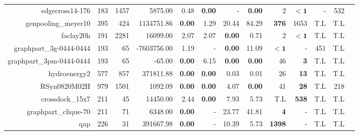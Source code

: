 \begin{landscape}
\begin{table*}[t]
\begin{tabular}{|r|r|r||r||r|r|r|r||r|r|r|r|r|}
                     edgecross14-176 &           183 &          1457 &                           5875.00 &           0.48 &  \textbf{0.00} &              - &  \textbf{0.00} &                  2 &         $\bm{< 1}$ &                  - &                532 \\ 
                 genpooling\_meyer10 &           395 &           424 &                        1134751.86 &  \textbf{0.00} &           1.29 &          20.44 &          84.29 &       \textbf{376} &               1653 &                T.L &                T.L \\ 
                           faclay20h &           191 &          2281 &                          16099.00 &           2.07 &           2.07 &  \textbf{0.00} &           0.71 &                  2 &         $\bm{< 1}$ &                T.L &                T.L \\ 
             graphpart\_3g-0444-0444 &           193 &            65 &                       -7603756.00 &           1.19 &              - &  \textbf{0.00} &          11.09 &         $\bm{< 1}$ &                  - &                451 &                T.L \\ 
            graphpart\_3pm-0444-0444 &           193 &            65 &                            -65.00 &  \textbf{0.00} &           6.15 &  \textbf{0.00} &  \textbf{0.00} &                 46 &         \textbf{3} &                T.L &                T.L \\ 
                        hydroenergy2 &           577 &           857 &                         371811.88 &  \textbf{0.00} &  \textbf{0.00} &           0.03 &           0.01 &                 26 &        \textbf{13} &                T.L &                T.L \\ 
                        RSyn0820M02H &           979 &          1501 &                           1092.09 &  \textbf{0.00} &  \textbf{0.00} &           4.07 &  \textbf{0.00} &                 41 &        \textbf{28} &                T.L &                218 \\ 
                     crossdock\_15x7 &           211 &            45 &                          14450.00 &           2.44 &  \textbf{0.00} &           7.93 &           5.73 &                T.L &       \textbf{538} &                T.L &                T.L \\ 
                graphpart\_clique-70 &           211 &            71 &                           6348.00 &  \textbf{0.00} &              - &          23.77 &          41.81 &         \textbf{4} &                  - &                T.L &                T.L \\ 
                                 qap &           226 &            31 &                         391667.98 &  \textbf{0.00} &              - &          10.39 &           5.73 &      \textbf{1398} &                  - &                T.L &                T.L \\ 
\hline 
\end{tabular}\\ 
\end{table*} 
\end{landscape} 
